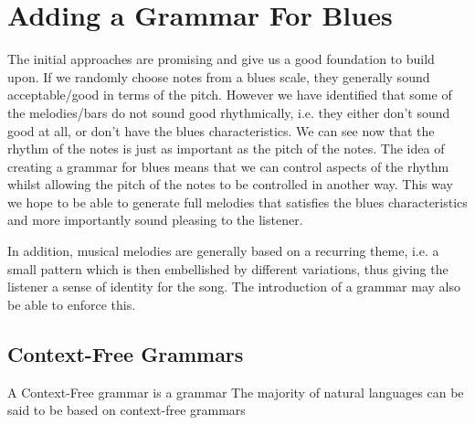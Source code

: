 \documentclass[pdftex,12pt,a4paper]{report}
\begin{document}
\section{Adding a Grammar For Blues}
The initial approaches are promising and give us a good foundation to build upon. If we randomly choose notes from a blues scale, they generally sound acceptable/good in terms of the pitch. However we have identified that some of the melodies/bars do not sound good rhythmically, i.e. they either don't sound good at all, or don't have the blues characteristics. We can see now that the rhythm of the notes is just as important as the pitch of the notes. The idea of creating a grammar for blues means that we can control aspects of the rhythm whilst allowing the pitch of the notes to be controlled in another way. This way we hope to be able to generate full melodies that satisfies the blues characteristics and more importantly sound pleasing to the listener.

In addition, musical melodies are generally based on a recurring theme, i.e. a small pattern which is then embellished by different variations, thus giving the listener a sense of identity for the song. The introduction of a grammar may also be able to enforce this.

\subsection{Context-Free Grammars}
A Context-Free grammar is a grammar 
The majority of natural languages can be said to be based on context-free grammars
\end{document}
